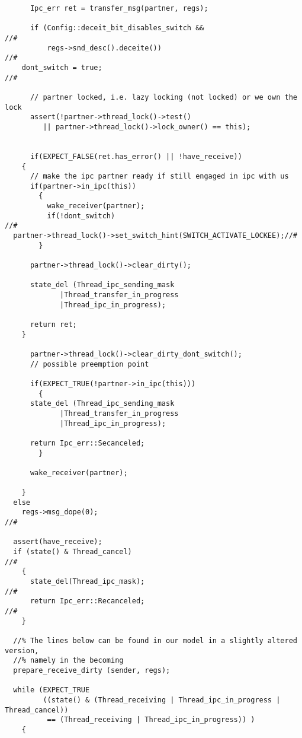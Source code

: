 \begin{lstlisting}
      Ipc_err ret = transfer_msg(partner, regs);

      if (Config::deceit_bit_disables_switch &&                            //#
          regs->snd_desc().deceite())                                      //#
	dont_switch = true;                                                //#

      // partner locked, i.e. lazy locking (not locked) or we own the lock
      assert(!partner->thread_lock()->test()                               
	     || partner->thread_lock()->lock_owner() == this);             


      if(EXPECT_FALSE(ret.has_error() || !have_receive))
	{
	  // make the ipc partner ready if still engaged in ipc with us
	  if(partner->in_ipc(this))
	    {
	      wake_receiver(partner);
	      if(!dont_switch)                                             //# 
  partner->thread_lock()->set_switch_hint(SWITCH_ACTIVATE_LOCKEE);//#
	    }

	  partner->thread_lock()->clear_dirty();

	  state_del (Thread_ipc_sending_mask
		     |Thread_transfer_in_progress
		     |Thread_ipc_in_progress);
	  
	  return ret;
	}

      partner->thread_lock()->clear_dirty_dont_switch();
      // possible preemption point

      if(EXPECT_TRUE(!partner->in_ipc(this)))
        {
	  state_del (Thread_ipc_sending_mask
		     |Thread_transfer_in_progress
		     |Thread_ipc_in_progress);
	
	  return Ipc_err::Secanceled;
        }

      wake_receiver(partner);

    }
  else
    regs->msg_dope(0);                                                   //#

  assert(have_receive);
  if (state() & Thread_cancel)                                           //#
    {
      state_del(Thread_ipc_mask);                                        //#
      return Ipc_err::Recanceled;                                        //#
    }

  //% The lines below can be found in our model in a slightly altered version,
  //% namely in the becoming
  prepare_receive_dirty (sender, regs);

  while (EXPECT_TRUE
         ((state() & (Thread_receiving | Thread_ipc_in_progress | Thread_cancel))
          == (Thread_receiving | Thread_ipc_in_progress)) ) 
    {
    

\end{lstlisting}
